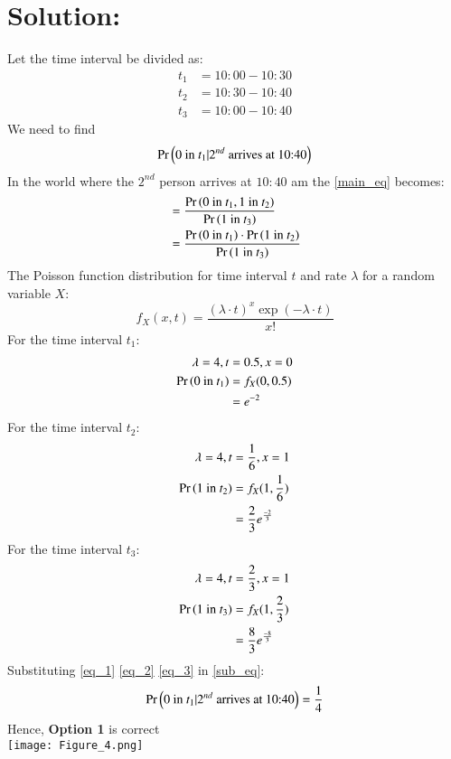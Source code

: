 \documentclass[journal,12pt,twocolumn]{IEEEtran}
\begin{document}
\section*{Solution:}
Let the time interval be divided as:
\begin{align*}
    t_1 &= 10:00 - 10:30\\
    t_2 &= 10:30 - 10:40\\
    t_3 &= 10:00 - 10:40
\end{align*}
We need to find
\begin{align}
    \Pr\left(0\text{ in } t_1 | 2^{nd}\text{ arrives at 10:40}\right) \label{main_eq}
\end{align}
In the world where the $2^{nd}$ person arrives at $10:40$ am the \eqref{main_eq} becomes:
\begin{align}
    &=\frac{\Pr\left(0\text{ in } t_1, 1 \text{ in } t_2\right)}{\Pr\left(1 \text{ in } t_3\right)}\\
    &= \frac{\Pr\left(0\text{ in } t_1\right) \cdot \Pr\left(1 \text{ in } t_2\right)}{\Pr\left(1 \text{ in } t_3\right)}\label{sub_eq}
\end{align}
The Poisson function distribution for time interval $t$ and rate $\lambda$ for a random variable $X$:
\[
    f_X(x,t) = \frac{(\lambda \cdot t)^x \exp{(-\lambda \cdot t)}}{x!}
\]
For the time interval $t_1$:
\begin{align}
    \lambda = 4, t &= 0.5, x= 0\\
    \Pr\left(0\text{ in } t_1\right) &= f_X(0,0.5)\\
    &= e^{-2}\label{eq_1}
\end{align}
For the time interval $t_2$:
\begin{align}
    \lambda = 4, t &= \frac{1}{6},x = 1\\
    \Pr\left(1 \text{ in } t_2\right) &= f_X(1, \frac{1}{6})\\
    &= \frac{2}{3}e^{\frac{-2}{3}} \label{eq_2}
\end{align}
For the time interval $t_3$:
\begin{align}
    \lambda = 4, t &= \frac{2}{3}, x = 1\\
    \Pr\left(1 \text{ in } t_3\right) &= f_X(1, \frac{2}{3})\\
    &= \frac{8}{3}e^{\frac{-8}{3}} \label{eq_3}
\end{align}
Substituting \eqref{eq_1} \eqref{eq_2} \eqref{eq_3} in \eqref{sub_eq}:
\begin{align}
    \Pr\left(0\text{ in } t_1 | 2^{nd}\text{ arrives at 10:40}\right) = \frac{1}{4}
\end{align}
Hence, \textbf{Option 1} is correct\\
\texttt{[image: Figure\_4.png]}
\end{document}
